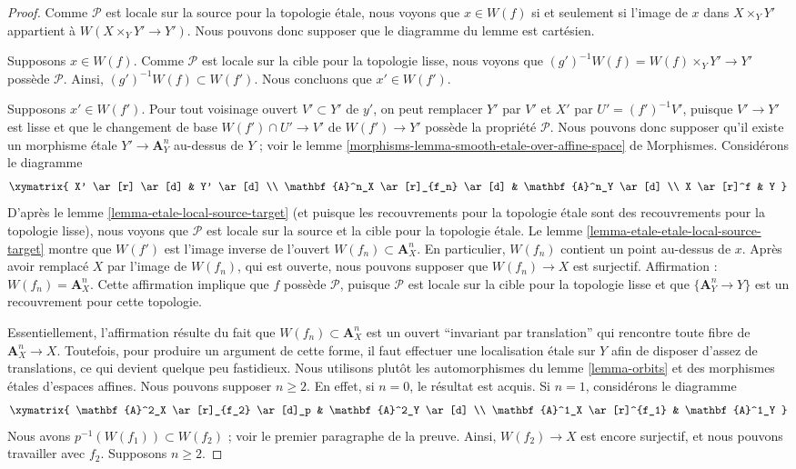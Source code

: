 \begin{proof}
Comme $\mathcal{P}$ est locale sur la source pour la topologie \'etale, nous
voyons que $x \in W(f)$ si et seulement si l'image de $x$ dans
$X \times_Y Y'$ appartient à $W(X \times_Y Y' \to Y')$. Nous pouvons donc
supposer que le diagramme du lemme est cartésien.

\medskip\noindent
Supposons $x \in W(f)$. Comme $\mathcal{P}$ est locale sur la cible pour la
topologie lisse, nous voyons que
$(g')^{-1}W(f) = W(f) \times_Y Y' \to Y'$ possède
$\mathcal{P}$. Ainsi, $(g')^{-1}W(f) \subset W(f')$. Nous concluons que
$x' \in W(f')$.

\medskip\noindent
Supposons $x' \in W(f')$. Pour tout voisinage ouvert $V' \subset Y'$ de $y'$,
on peut remplacer $Y'$ par $V'$ et $X'$ par $U' = (f')^{-1}V'$, puisque
$V' \to Y'$ est lisse et que le changement de base
$W(f') \cap U' \to V'$ de $W(f') \to Y'$ possède la propriété $\mathcal{P}$.
Nous pouvons donc supposer qu'il existe un morphisme \'etale
$Y' \to \mathbf{A}^n_Y$ au-dessus de $Y$ ; voir le
lemme \ref{morphisms-lemma-smooth-etale-over-affine-space} de Morphismes.
Considérons le diagramme
$$
\xymatrix{
X' \ar[r] \ar[d] & Y' \ar[d] \\
\mathbf{A}^n_X \ar[r]_{f_n} \ar[d] & \mathbf{A}^n_Y \ar[d] \\
X \ar[r]^f & Y
}
$$
D'après le lemme \ref{lemma-etale-local-source-target} (et puisque les
recouvrements pour la topologie \'etale sont des recouvrements pour la
topologie lisse), nous voyons que $\mathcal{P}$ est locale sur la source et la
cible pour la topologie \'etale. Le
lemme \ref{lemma-etale-etale-local-source-target} montre que
$W(f')$ est l'image inverse de l'ouvert $W(f_n) \subset \mathbf{A}^n_X$. En
particulier, $W(f_n)$ contient un point au-dessus de $x$. Après avoir remplacé
$X$ par l'image de $W(f_n)$, qui est ouverte, nous pouvons supposer que
$W(f_n) \to X$ est surjectif. Affirmation :
$W(f_n) = \mathbf{A}^n_X$. Cette affirmation implique que $f$ possède
$\mathcal{P}$, puisque $\mathcal{P}$ est locale sur la cible pour la topologie
lisse et que $\{\mathbf{A}^n_Y \to Y\}$ est un recouvrement pour cette
topologie.

\medskip\noindent
Essentiellement, l'affirmation résulte du fait que
$W(f_n) \subset \mathbf{A}^n_X$ est un ouvert ``invariant par translation''
qui rencontre toute fibre de $\mathbf{A}^n_X \to X$. Toutefois, pour produire
un argument de cette forme, il faut effectuer une localisation \'etale sur
$Y$ afin de disposer d'assez de translations, ce qui devient quelque peu
fastidieux. Nous utilisons plutôt les automorphismes du
lemme \ref{lemma-orbits} et des morphismes étales d'espaces affines.
Nous pouvons supposer $n \geq 2$. En effet, si $n = 0$, le résultat est acquis.
Si $n = 1$, considérons le diagramme
$$
\xymatrix{
\mathbf{A}^2_X \ar[r]_{f_2} \ar[d]_p & \mathbf{A}^2_Y \ar[d] \\
\mathbf{A}^1_X \ar[r]^{f_1} & \mathbf{A}^1_Y
}
$$
Nous avons $p^{-1}(W(f_1)) \subset W(f_2)$ ; voir le premier paragraphe de la
preuve. Ainsi, $W(f_2) \to X$ est encore surjectif, et nous pouvons travailler
avec $f_2$. Supposons $n \geq 2$.


\end{proof}
